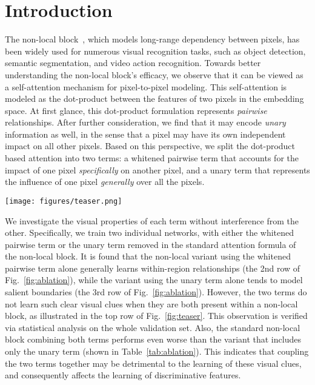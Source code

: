 \documentclass[runningheads]{llncs}
\begin{document}
\section{Introduction}

The non-local block~\cite{wang2018non}, which models long-range dependency between pixels, has been widely used for numerous visual recognition tasks, such as object detection, semantic segmentation, and video action recognition. Towards better understanding the non-local block's efficacy, we observe that it can be viewed as a self-attention mechanism for pixel-to-pixel modeling. This self-attention is modeled as the dot-product between the features of two pixels in the embedding space. At first glance, this dot-product formulation represents \emph{pairwise} relationships. After further consideration, we find that it may encode \emph{unary} information as well, in the sense that a pixel may have its own independent impact on all other pixels. Based on this perspective, we split the dot-product based attention into two terms: a whitened pairwise term that accounts for the impact of one pixel {\em specifically} on another pixel, and a unary term that represents the influence of one pixel {\em generally} over all the pixels.

\begin{figure*}[t]
\begin{center}
\texttt{[image: figures/teaser.png]}
\end{center}
\vspace{-20pt}
   \caption{Visualization of attention maps in the non-local block and our disentangled non-local block. With the disentanglement of our non-local block, the whitened pairwise term learns clear within-region clues while the unary term learns salient boundaries, which cannot be observed with the original non-local block}
\label{fig:teaser}
\vspace{-10pt}
\end{figure*}

We investigate the visual properties of each term without interference from the other. Specifically, we train two individual networks, with either the whitened pairwise term or the unary term removed in the standard attention formula of the non-local block. It is found that the non-local variant using the whitened pairwise term alone generally learns within-region relationships (the 2nd row of Fig.~\ref{fig:ablation}), while the variant using the unary term alone tends to model salient boundaries (the 3rd row of Fig.~\ref{fig:ablation}). However, the two terms do not learn such clear visual clues when they are both present within a non-local block, as illustrated in the top row of Fig.~\ref{fig:teaser}. This observation is verified via statistical analysis on the whole validation set. Also, the standard non-local block combining both terms performs even worse than the variant that includes only the unary term (shown in Table~\ref{tab:ablation}). This indicates that coupling the two terms together may be detrimental to the learning of these visual clues, and consequently affects the learning of discriminative features.
\end{document}
